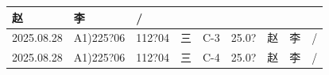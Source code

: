 \documentclass[UTF8,10pt,a4paper,fontset=fandol]{ctexart}
\newcommand{\fieldvalue}[1]{#1}
\newcommand{\handwritten}[1]{#1}
\begin{document}
\begin{tabular}{|p{1.55cm}|p{2.05cm}|p{1.35cm}|p{1.35cm}|p{1.55cm}|p{1.45cm}|p{1.25cm}|p{1.25cm}|p{1.20cm}|}
\fieldvalue{\handwritten{赵}} &
\fieldvalue{\handwritten{李}} &
\fieldvalue{\handwritten{/}} \\
\hline
\fieldvalue{\handwritten{2025.08.28}} &
\fieldvalue{\handwritten{A1)225?06}} &
\fieldvalue{\handwritten{112?04}} &
\fieldvalue{\handwritten{三}} &
\fieldvalue{\handwritten{C-3}} &
\fieldvalue{\handwritten{25.0?}} &
\fieldvalue{\handwritten{赵}} &
\fieldvalue{\handwritten{李}} &
\fieldvalue{\handwritten{/}} \\
\hline
\fieldvalue{\handwritten{2025.08.28}} &
\fieldvalue{\handwritten{A1)225?06}} &
\fieldvalue{\handwritten{112?04}} &
\fieldvalue{\handwritten{三}} &
\fieldvalue{\handwritten{C-4}} &
\fieldvalue{\handwritten{25.0?}} &
\fieldvalue{\handwritten{赵}} &
\fieldvalue{\handwritten{李}} &
\fieldvalue{\handwritten{/}} \\
\hline

\end{tabular}
\end{document}

